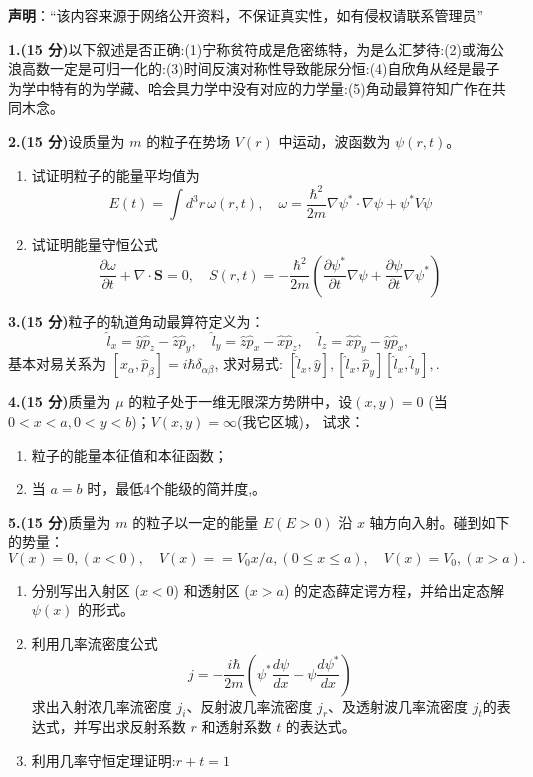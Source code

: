 
\textbf{声明}：“该内容来源于网络公开资料，不保证真实性，如有侵权请联系管理员”

\textbf{1.(15 分)}以下叙述是否正确:(1)宁称贫符成是危密练特，为是么汇梦待:(2)或海公浪高数一定是可归一化的:(3)时间反演对称性导致能尿分恒:(4)自欣角从经是最子为学中特有的为学藏、哈会具力学中没有对应的力学量:(5)角动最算符知广作在共同木念。

\textbf{2.(15 分)}设质量为 $m$ 的粒子在势场 $V(r)$ 中运动，波函数为 $\psi(r,t)$。

\begin{enumerate}
    \item  试证明粒子的能量平均值为
    \[
    E(t) = \int d^3r \, \omega(r,t), \quad \omega = \frac{\hbar^2}{2m} \nabla \psi^* \cdot \nabla \psi + \psi^* V \psi~
    \]
    
    \item  试证明能量守恒公式
    \[
    \frac{\partial \omega}{\partial t} + \nabla \cdot \mathbf{S} = 0, \quad S(r,t) = -\frac{\hbar^2}{2m} \left(\frac{\partial \psi^*}{\partial t} \nabla \psi + \frac{\partial \psi}{\partial t} \nabla \psi^*\right)~
    \]
\end{enumerate}
\textbf{3.(15 分)}粒子的轨道角动最算符定义为：
\[
\hat{l}_x = \hat{y} \hat{p}_z - \hat{z} \hat{p}_y, \quad \hat{l}_y = \hat{z} \hat{p}_x - \hat{x} \hat{p}_z, \quad \hat{l}_z = \hat{x} \hat{p}_y - \hat{y} \hat{p}_x,~
\]
基本对易关系为
$[\hat{x}_\alpha, \hat{p}_\beta] = i\hbar \delta_{\alpha\beta}$, 求对易式: $[\hat{l}_x, \hat{y}] ,  [\hat{l}_x, \hat{p}_y] [\hat{l}_x, \hat{l}_y] , .$

\textbf{4.(15 分)}质量为 $\mu$ 的粒子处于一维无限深方势阱中，设$(x,y)=0$ (当 $0 < x < a, 0 < y < b$)；$V(x, y) =\infty$(我它区城)，
试求：
\begin{enumerate}
    \item  粒子的能量本征值和本征函数；
    \item  当 $a = b$ 时，最低4个能级的简并度,。
\end{enumerate}

\textbf{5.(15 分)}质量为 $m$ 的粒子以一定的能量 $E (E > 0)$ 沿 $x$ 轴方向入射。碰到如下的势量：
\[
V(x) = 0, (x < 0), \quad V(x) = =V_0 x/a, (0 \leq x \leq a), \quad V(x) = V_0, (x > a).~
\]

\begin{enumerate}
    \item  分别写出入射区 ($x < 0$) 和透射区 ($x > a$) 的定态薛定谔方程，并给出定态解 $\psi(x)$ 的形式。
    
    \item  利用几率流密度公式
    \[
    j = -\frac{i\hbar}{2m} \left(\psi^* \frac{d\psi}{dx} - \psi \frac{d\psi^*}{dx} \right)~
    \]
    求出入射浓几率流密度 $j_i$、反射波几率流密度 $j_r$、及透射波几率流密度 $j_t$的表达式，并写出求反射系数 $r$ 和透射系数 $t$ 的表达式。
    \item  利用几率守恒定理证明:$r+t=1$
\end{enumerate}


